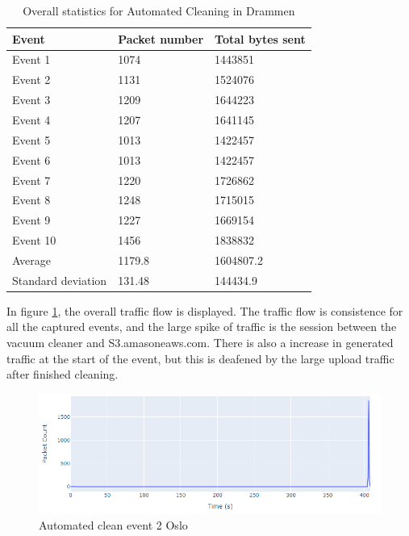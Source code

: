 \begin{table}[H]
\centering
\caption{Overall statistics for Automated Cleaning in Drammen}
\label{tab:ACoverallDRA}
\begin{tabular}{|l|l|l|}
\hline
\textbf{Event} & \textbf{Packet number} & \textbf{Total bytes sent} \\ \hline
Event 1        & 1074                   & 1443851                   \\ \hline
Event 2        & 1131                   & 1524076                   \\ \hline
Event 3        & 1209                   & 1644223                   \\ \hline
Event 4        & 1207                   & 1641145                   \\ \hline
Event 5        & 1013                   & 1422457                   \\ \hline
Event 6        & 1013                   & 1422457                   \\ \hline
Event 7        & 1220                   & 1726862                   \\ \hline
Event 8        & 1248                   & 1715015                   \\ \hline
Event 9        & 1227                   & 1669154                   \\ \hline
Event 10       & 1456                   & 1838832                   \\ \hline
Average        & 1179.8                 & 1604807.2                 \\ \hline
Standard deviation        & 131.48
       & 144434.9               \\ \hline
\end{tabular}
\end{table}

In figure \ref{fig:Ac-graph}, the overall traffic flow is displayed. The traffic flow is consistence for all the captured events, and the large spike of traffic is the session between the vacuum cleaner and S3.amasoneaws.com. There is also a increase in generated traffic at the start of the event, but this is 
deafened by the large upload traffic after finished cleaning.

\begin{figure}[H]
    \centering
    \includegraphics[width=\textwidth]{figures/AC-graph.png}
    \caption{Automated clean event 2 Oslo}
    \label{fig:Ac-graph}
\end{figure}

